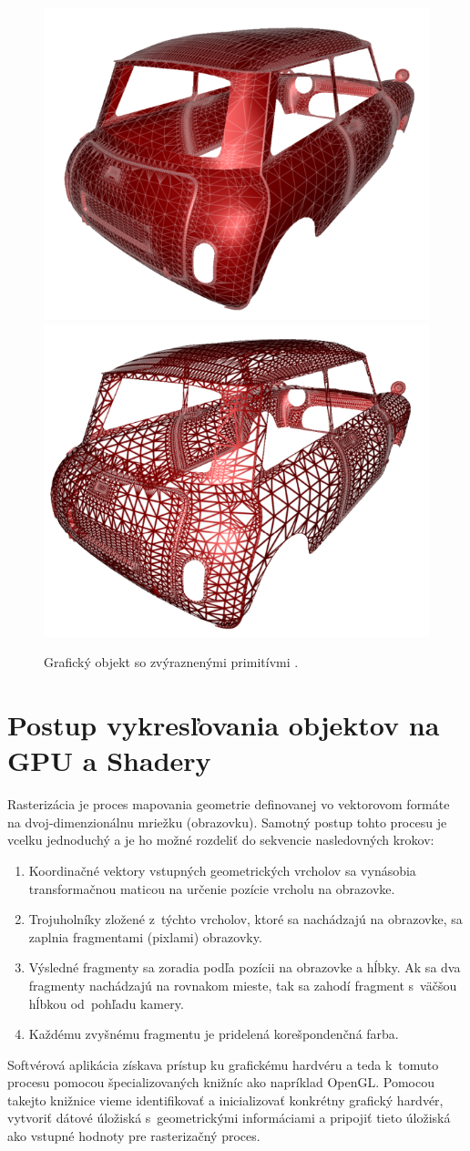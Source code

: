 \begin{figure}[t] \label{wireframe}
    \centering
    \includegraphics[width=0.35\linewidth]{obrazky-figures/wireframe1.png}
    \includegraphics[width=0.35\linewidth]{obrazky-figures/wireframe2.png}
    \caption{Grafický objekt so zvýraznenými primitívmi \cite{wireframeObr}.}
\end{figure}

\section{Postup vykresľovania objektov na GPU a Shadery}
\label{renderingOnGPU}
Rasterizácia \cite{GraphicsPipeline} je proces mapovania geometrie definovanej vo vektorovom formáte na dvoj-dimenzionálnu mriežku (obrazovku). Samotný postup tohto procesu je vcelku jednoduchý a je ho možné rozdeliť do sekvencie nasledovných krokov:
\begin{enumerate}
    \item Koordinačné vektory vstupných geometrických vrcholov sa vynásobia transformačnou maticou na určenie pozície vrcholu na obrazovke.
    \item Trojuholníky zložené z~týchto vrcholov, ktoré sa nachádzajú na obrazovke, sa zaplnia fragmentami (pixlami) obrazovky.
    \item Výsledné fragmenty sa zoradia podľa pozícii na obrazovke a hĺbky. Ak sa dva fragmenty nachádzajú na rovnakom mieste, tak sa zahodí fragment s~väčšou hĺbkou od~pohľadu kamery.
    \item Každému zvyšnému fragmentu je pridelená korešpondenčná farba.
\end{enumerate}

Softvérová aplikácia \cite{GraphicsPipeline} získava prístup ku grafickému hardvéru a teda k~tomuto procesu pomocou špecializovaných knižníc ako napríklad OpenGL. Pomocou takejto knižnice vieme identifikovať a inicializovať konkrétny grafický hardvér, vytvoriť dátové úložiská s~geometrickými informáciami a pripojiť tieto úložiská ako vstupné hodnoty pre rasterizačný proces.

